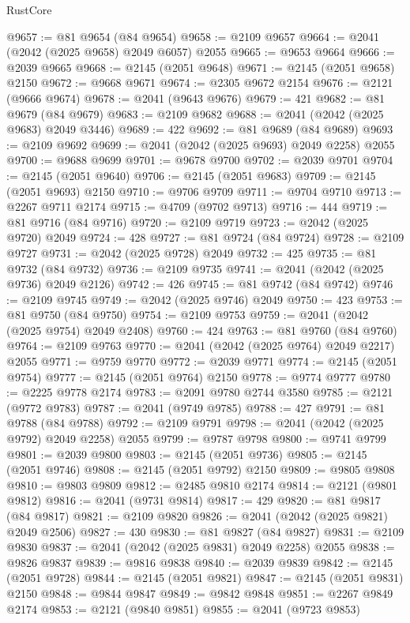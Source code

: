 \begin{lexlean}{RustCore}
\begin{coremodule}
@9657 := @81 @9654 (@84 @9654)
@9658 := @2109 @9657
@9664 := @2041 (@2042 (@2025 @9658) @2049 @6057) @2055
@9665 := @9653 @9664
@9666 := @2039 @9665
@9668 := @2145 (@2051 @9648)
@9671 := @2145 (@2051 @9658) @2150
@9672 := @9668 @9671
@9674 := @2305 @9672 @2154
@9676 := @2121 (@9666 @9674)
@9678 := @2041 (@9643 @9676)
@9679 := 421
@9682 := @81 @9679 (@84 @9679)
@9683 := @2109 @9682
@9688 := @2041 (@2042 (@2025 @9683) @2049 @3446)
@9689 := 422
@9692 := @81 @9689 (@84 @9689)
@9693 := @2109 @9692
@9699 := @2041 (@2042 (@2025 @9693) @2049 @2258) @2055
@9700 := @9688 @9699
@9701 := @9678 @9700
@9702 := @2039 @9701
@9704 := @2145 (@2051 @9640)
@9706 := @2145 (@2051 @9683)
@9709 := @2145 (@2051 @9693) @2150
@9710 := @9706 @9709
@9711 := @9704 @9710
@9713 := @2267 @9711 @2174
@9715 := @4709 (@9702 @9713)
@9716 := 444
@9719 := @81 @9716 (@84 @9716)
@9720 := @2109 @9719
@9723 := @2042 (@2025 @9720) @2049
@9724 := 428
@9727 := @81 @9724 (@84 @9724)
@9728 := @2109 @9727
@9731 := @2042 (@2025 @9728) @2049
@9732 := 425
@9735 := @81 @9732 (@84 @9732)
@9736 := @2109 @9735
@9741 := @2041 (@2042 (@2025 @9736) @2049 @2126)
@9742 := 426
@9745 := @81 @9742 (@84 @9742)
@9746 := @2109 @9745
@9749 := @2042 (@2025 @9746) @2049
@9750 := 423
@9753 := @81 @9750 (@84 @9750)
@9754 := @2109 @9753
@9759 := @2041 (@2042 (@2025 @9754) @2049 @2408)
@9760 := 424
@9763 := @81 @9760 (@84 @9760)
@9764 := @2109 @9763
@9770 := @2041 (@2042 (@2025 @9764) @2049 @2217) @2055
@9771 := @9759 @9770
@9772 := @2039 @9771
@9774 := @2145 (@2051 @9754)
@9777 := @2145 (@2051 @9764) @2150
@9778 := @9774 @9777
@9780 := @2225 @9778 @2174
@9783 := @2091 @9780 @2744 @3580
@9785 := @2121 (@9772 @9783)
@9787 := @2041 (@9749 @9785)
@9788 := 427
@9791 := @81 @9788 (@84 @9788)
@9792 := @2109 @9791
@9798 := @2041 (@2042 (@2025 @9792) @2049 @2258) @2055
@9799 := @9787 @9798
@9800 := @9741 @9799
@9801 := @2039 @9800
@9803 := @2145 (@2051 @9736)
@9805 := @2145 (@2051 @9746)
@9808 := @2145 (@2051 @9792) @2150
@9809 := @9805 @9808
@9810 := @9803 @9809
@9812 := @2485 @9810 @2174
@9814 := @2121 (@9801 @9812)
@9816 := @2041 (@9731 @9814)
@9817 := 429
@9820 := @81 @9817 (@84 @9817)
@9821 := @2109 @9820
@9826 := @2041 (@2042 (@2025 @9821) @2049 @2506)
@9827 := 430
@9830 := @81 @9827 (@84 @9827)
@9831 := @2109 @9830
@9837 := @2041 (@2042 (@2025 @9831) @2049 @2258) @2055
@9838 := @9826 @9837
@9839 := @9816 @9838
@9840 := @2039 @9839
@9842 := @2145 (@2051 @9728)
@9844 := @2145 (@2051 @9821)
@9847 := @2145 (@2051 @9831) @2150
@9848 := @9844 @9847
@9849 := @9842 @9848
@9851 := @2267 @9849 @2174
@9853 := @2121 (@9840 @9851)
@9855 := @2041 (@9723 @9853)

\end{coremodule}
\end{lexlean}
